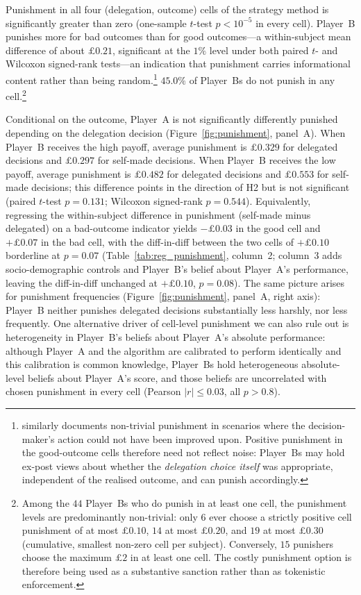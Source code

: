 Punishment in all four (delegation, outcome) cells of the strategy method is significantly greater than zero (one-sample $t$-test $p<10^{-5}$ in every cell). Player~B punishes more for bad outcomes than for good outcomes---a within-subject mean difference of about $\pounds 0.21$, significant at the $1\%$ level under both paired $t$- and Wilcoxon signed-rank tests---an indication that punishment carries informational content rather than being random.\footnote{\citet{coffman_intermediation_2011} similarly documents non-trivial punishment in scenarios where the decision-maker's action could not have been improved upon. Positive punishment in the good-outcome cells therefore need not reflect noise: Player~Bs may hold ex-post views about whether the \textit{delegation choice itself} was appropriate, independent of the realised outcome, and can punish accordingly.} $45.0\%$ of Player~Bs do not punish in any cell.\footnote{Among the $44$ Player~Bs who do punish in at least one cell, the punishment levels are predominantly non-trivial: only $6$ ever choose a strictly positive cell punishment of at most $\pounds 0.10$, $14$ at most $\pounds 0.20$, and $19$ at most $\pounds 0.30$ (cumulative, smallest non-zero cell per subject). Conversely, $15$ punishers choose the maximum $\pounds 2$ in at least one cell. The costly punishment option is therefore being used as a substantive sanction rather than as tokenistic enforcement.}

Conditional on the outcome, Player~A is not significantly differently punished depending on the delegation decision (Figure~\ref{fig:punishment}, panel~A). When Player~B receives the high payoff, average punishment is $\pounds 0.329$ for delegated decisions and $\pounds 0.297$ for self-made decisions. When Player~B receives the low payoff, average punishment is $\pounds 0.482$ for delegated decisions and $\pounds 0.553$ for self-made decisions; this difference points in the direction of H2 but is not significant (paired $t$-test $p=0.131$; Wilcoxon signed-rank $p=0.544$). Equivalently, regressing the within-subject difference in punishment (self-made minus delegated) on a bad-outcome indicator yields $-\pounds 0.03$ in the good cell and $+\pounds 0.07$ in the bad cell, with the diff-in-diff between the two cells of $+\pounds 0.10$ borderline at $p=0.07$ (Table~\ref{tab:reg_punishment}, column~2; column~3 adds socio-demographic controls and Player~B's belief about Player~A's performance, leaving the diff-in-diff unchanged at $+\pounds 0.10$, $p=0.08$). The same picture arises for punishment frequencies (Figure~\ref{fig:punishment}, panel~A, right axis): Player~B neither punishes delegated decisions substantially less harshly, nor less frequently. One alternative driver of cell-level punishment we can also rule out is heterogeneity in Player~B's beliefs about Player~A's absolute performance: although Player~A and the algorithm are calibrated to perform identically and this calibration is common knowledge, Player~Bs hold heterogeneous absolute-level beliefs about Player~A's score, and those beliefs are uncorrelated with chosen punishment in every cell (Pearson $|r|\le 0.03$, all $p>0.8$).

